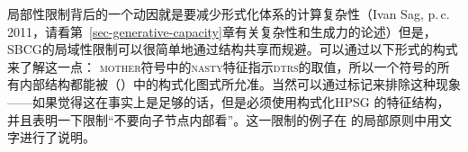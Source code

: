 局部性限制背后的一个动因就是要减少形式化体系的计算复杂性（Ivan Sag, p.\,c.\,2011，请看第~\ref{sec-generative-capacity}章有关复杂性和生成力的论述）但是，SBCG的局域性限制可以很简单地通过结构共享而规避\citep[\S~9.6.1]{MuellerGTBuch2}。可以通过以下形式的构式来了解这一点：
\ea
{}
\z
\textsc{mother}符号中的\textsc{nasty}特征指示\textsc{dtrs}的取值，所以一个符号的所有内部结构都能被（）中的构式化图式所允准。当然可以通过标记来排除这种现象——如果觉得这在事实上是足够的话，但是必须使用构式化HPSG \citep{Sag97a}的特征结构，并且表明一下限制“不要向子节点内部看”。这一限制的例子在 \citet[--144]{ps}的局部原则中用文字进行了说明。


